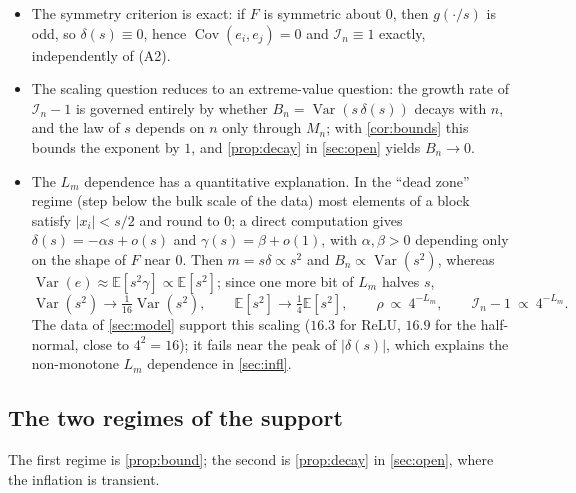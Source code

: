 \documentclass[twocolumn,review,hidelinks,oneeqnum,onetabnum,onefignum,onethmnum]{siamart251216}
\begin{document}
\begin{itemize}
\item The symmetry criterion is exact: if $F$ is symmetric about $0$, then
$g(\cdot/s)$ is odd, so $\delta(s)\equiv0$, hence
$\operatorname{Cov}(e_i,e_j)=0$ and $\mathcal I_n\equiv1$ exactly, independently
of (A2).

\item The scaling question reduces to an extreme-value question: the growth rate
of $\mathcal I_n-1$ is governed entirely by whether
$B_n=\operatorname{Var}(s\,\delta(s))$ decays with $n$, and the law of $s$
depends on $n$ only through $M_n$; with \cref{cor:bounds} this bounds the
exponent by $1$, and \cref{prop:decay} in \cref{sec:open} yields $B_n\to0$.

\item The $L_m$ dependence has a quantitative explanation. In the ``dead zone''
regime (step below the bulk scale of the data) most elements of a block satisfy
$|x_i|<s/2$ and round to $0$; a direct computation gives
$\delta(s)=-\alpha s+o(s)$ and $\gamma(s)=\beta+o(1)$, with $\alpha,\beta>0$
depending only on the shape of $F$ near $0$. Then $m=s\delta\propto s^2$ and
$B_n\propto\operatorname{Var}(s^2)$, whereas
$\operatorname{Var}(e)\approx\mathbb{E}[s^2\gamma]\propto\mathbb{E}[s^2]$; since
one more bit of $L_m$ halves $s$,
\begin{equation}
\operatorname{Var}(s^2)\to\tfrac1{16}\operatorname{Var}(s^2),\qquad
\mathbb{E}[s^2]\to\tfrac14\mathbb{E}[s^2],\qquad
\rho\ \propto\ 4^{-L_m},\qquad \mathcal I_n-1\ \propto\ 4^{-L_m}.
\label{eq:lmscaling}
\end{equation}
The data of \cref{sec:model} support this scaling ($16.3$ for ReLU, $16.9$ for
the half-normal, close to $4^{2}=16$); it fails near the peak of $|\delta(s)|$,
which explains the non-monotone $L_m$ dependence in \cref{sec:infl}.
\end{itemize}

\subsection{The two regimes of the support}
\label{sec:domains}

The first regime is \cref{prop:bound}; the second is \cref{prop:decay} in
\cref{sec:open}, where the inflation is transient.
\end{document}
